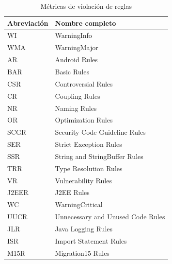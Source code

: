 \begin{table}[H]
{
\fontsize{9pt}{5pt}\selectfont
\captionsetup{labelsep=period, labelfont=bf}
\caption{Métricas de violación de reglas}
\centering
\begin{tabular}{ll}
 \toprule
\textbf{Abreviación} & \textbf{Nombre completo}          \\
\midrule
WI                   & WarningInfo                                           \\
WMA                  & WarningMajor                                         \\
AR                   & Android Rules                                          \\
BAR                  & Basic Rules                                            \\
CSR                  & Controversial Rules                                    \\
CR                   & Coupling Rules                                        \\
NR                   & Naming Rules                                           \\
OR                   & Optimization Rules                                     \\
SCGR                 & Security Code Guideline Rules                          \\
SER                  & Strict Exception Rules                                 \\
SSR                  & String and StringBuffer Rules                           \\
TRR                  & Type Resolution Rules                                  \\
VR                   & Vulnerability Rules                                   \\
J2EER                & J2EE Rules                                              \\
WC                   & WarningCritical                                          \\
UUCR                 & Unnecessary and Unused Code Rules                         \\
JLR                  & Java Logging Rules                                       \\
ISR                  & Import Statement Rules                                    \\
M15R                 & Migration15 Rules                                         \\

\end{tabular}}
\end{table}
